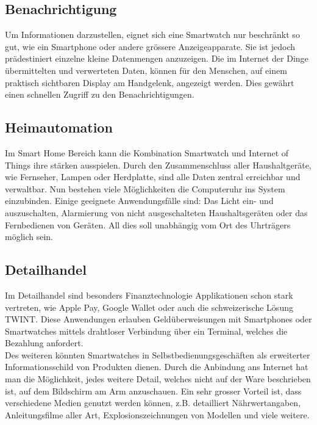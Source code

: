 \subsection{Benachrichtigung}
Um Informationen darzustellen, eignet sich eine Smartwatch nur beschränkt so gut, wie ein Smartphone oder andere grössere Anzeigeapparate. Sie ist jedoch prädestiniert einzelne kleine Datenmengen anzuzeigen. Die im Internet der Dinge übermittelten und verwerteten Daten, können für den Menschen, auf einem praktisch sichtbaren Display am Handgelenk, angezeigt werden. Dies gewährt einen schnellen Zugriff zu den Benachrichtigungen.

\subsection{Heimautomation}
Im Smart Home Bereich kann die Kombination Smartwatch und Internet of Things ihre stärken ausspielen. Durch den Zusammenschluss aller Haushaltgeräte, wie Fernseher, Lampen oder Herdplatte, sind alle Daten zentral erreichbar und verwaltbar. Nun bestehen viele Möglichkeiten die Computeruhr ins System einzubinden. Einige geeignete Anwendungsfälle sind: Das Licht ein- und auszuschalten, Alarmierung von nicht ausgeschalteten Haushaltsgeräten oder das Fernbedienen von Geräten. All dies soll unabhängig vom Ort des Uhrträgers möglich sein.

\subsection{Detailhandel}
Im Detailhandel sind besonders Finanztechnologie Applikationen schon stark vertreten, wie Apple Pay, Google Wallet oder auch die schweizerische Lösung TWINT. Diese Anwendungen erlauben Geldüberweisungen mit Smartphones oder Smartwatches mittels drahtloser Verbindung über ein Terminal, welches die Bezahlung anfordert.\\
Des weiteren könnten Smartwatches in Selbstbedienungsgeschäften als erweiterter Informationsschild von Produkten dienen. Durch die Anbindung ans Internet hat man die Möglichkeit, jedes weitere Detail, welches nicht auf der Ware beschrieben ist, auf dem Bildschirm am Arm anzuschauen. Ein sehr grosser Vorteil ist, dass verschiedene Medien genutzt werden können, z.B. detailliert Nährwertangaben, Anleitungsfilme aller Art, Explosionszeichnungen von Modellen und viele weitere.

